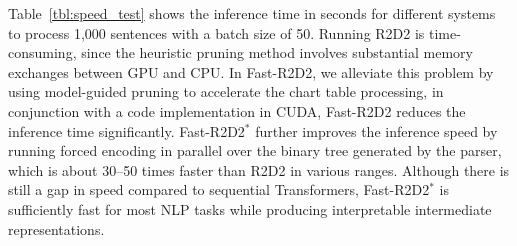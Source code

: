 \begin{table}%
\small
\begin{center}
\setlength{\tabcolsep}{3.pt}
\end{center}
\caption{Inference time in seconds for various systems to process 1,000 sentences with a batch size of 50.}
\label{tbl:speed_test}
\end{table}

Table~\ref{tbl:speed_test} shows the inference time in seconds for different systems to process 1,000 sentences with a batch size of 50.
Running R2D2 is time-consuming, since the heuristic pruning method involves substantial memory exchanges between GPU and CPU. 
In Fast-R2D2, we alleviate this problem by using model-guided pruning to accelerate the chart table processing,
in conjunction with a code implementation in CUDA, Fast-R2D2 reduces the inference time significantly. 
Fast-R2D2$^{*}$ further improves the inference speed by running forced encoding in parallel over the binary tree generated by the parser, which is about 30--50 times faster than R2D2 in various ranges. 
Although there is still a gap in speed compared to sequential Transformers, Fast-R2D2$^{*}$ is sufficiently fast for most NLP tasks while producing interpretable intermediate representations.
